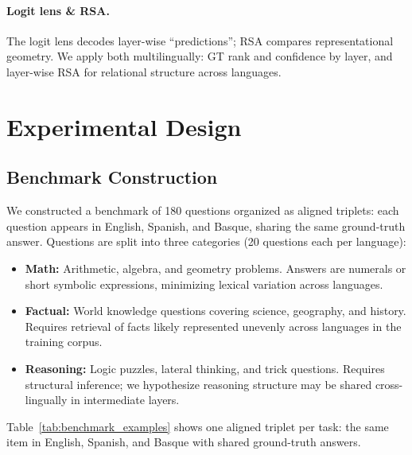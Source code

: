 \documentclass[10pt]{article}
\begin{document}
\paragraph{Logit lens \& RSA.}
The logit lens \citep{nostalgebraist2020logitlens} decodes layer-wise ``predictions''; RSA compares representational geometry. We apply both multilingually: GT rank and confidence by layer, and layer-wise RSA for relational structure across languages.

\section{Experimental Design}
\label{sec:methods}

\subsection{Benchmark Construction}

We constructed a benchmark of 180 questions organized as aligned triplets: each
question appears in English, Spanish, and Basque, sharing the same ground-truth
answer. Questions are split into three categories (20 questions each per language):

\begin{itemize}[leftmargin=*,itemsep=1pt]
  \item \textbf{Math:} Arithmetic, algebra, and geometry problems. Answers are
  numerals or short symbolic expressions, minimizing lexical variation across languages.
  \item \textbf{Factual:} World knowledge questions covering science, geography, and
  history. Requires retrieval of facts likely represented unevenly across languages
  in the training corpus.
  \item \textbf{Reasoning:} Logic puzzles, lateral thinking, and trick questions.
  Requires structural inference; we hypothesize reasoning structure may be shared
  cross-lingually in intermediate layers.
\end{itemize}

Table~\ref{tab:benchmark_examples} shows one aligned triplet per task: the same item in English, Spanish, and Basque with shared ground-truth answers.
\end{document}
